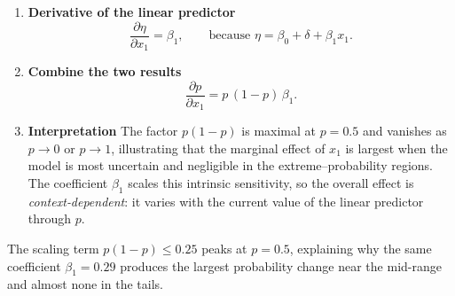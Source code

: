 {\begin{enumerate}[a)]
\begin{enumerate}[(i)]
\begin{enumerate}
    Rewriting using the power rule:
    \[
    \sigma(\eta) = (1 + e^{-\eta})^{-1},
    \]
    so by the chain rule:
    \[
    \frac{d\sigma}{d\eta}
      = -1 \cdot (1 + e^{-\eta})^{-2} \cdot \frac{d}{d\eta}(1 + e^{-\eta})
      = \frac{e^{-\eta}}{(1 + e^{-\eta})^2}.
    \]
    
    To express this in terms of \( \sigma(\eta) \), note:
    \[
    \sigma(\eta) = \frac{1}{1 + e^{-\eta}},
    \quad\text{and}\quad
    1 - \sigma(\eta) = \frac{e^{-\eta}}{1 + e^{-\eta}}.
    \]
    
    Hence:
    \[
    \sigma(\eta)\,(1 - \sigma(\eta)) = \frac{1}{1 + e^{-\eta}} \cdot \frac{e^{-\eta}}{1 + e^{-\eta}} = \frac{e^{-\eta}}{(1 + e^{-\eta})^2}.
    \]
    
    So the derivative simplifies to:
    \[
    \frac{\partial p}{\partial \eta}
      = \frac{d\sigma}{d\eta}
      = \sigma(\eta)\,(1 - \sigma(\eta))
      = p\,(1 - p).
    \]
    
      \item \textbf{Derivative of the linear predictor}
      \[
        \frac{\partial \eta}{\partial x_{1}}
          =\beta_{1},
        \qquad
        \text{because } \eta=\beta_{0}+\delta+\beta_{1}x_{1}.
      \]
    
      \item \textbf{Combine the two results}
      \[
        \boxed{\displaystyle
          \frac{\partial p}{\partial x_{1}}
            = p\,(1-p)\,\beta_{1}} .
      \]
    
      \item \textbf{Interpretation}  
      The factor \(p(1-p)\) is maximal at \(p=0.5\) and vanishes as \(p\to0\) or \(p\to1\),
      illustrating that the marginal effect of \(x_{1}\) is largest when the model is
      most uncertain and negligible in the extreme–probability regions.  The coefficient
      \(\beta_{1}\) scales this intrinsic sensitivity, so the overall effect is
      \emph{context‐dependent}: it varies with the current value of the linear predictor
      through \(p\).
    \end{enumerate}
    
    \noindent%
    The scaling term \(p(1-p)\le 0.25\) peaks at \(p=0.5\), explaining
    why the same coefficient \(\beta_{1}=0.29\) produces the largest
    probability change near the mid-range and almost none in the tails.
    
    

\end{enumerate}
\end{enumerate}}
